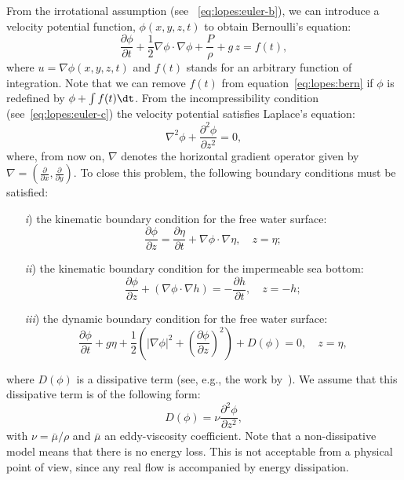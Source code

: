 From the irrotational assumption (see
~\eqref{eq:lopes:euler-b}), we can introduce a velocity
potential function, $\phi(x,y,z,t)$ to
obtain Bernoulli's equation:
\begin{equation}\label{eq:lopes:bern}
\frac{\partial \phi}{\partial t}+\frac{1}{2}\nabla \phi \cdot\nabla \phi
+\frac{P}{\rho} +g\, z=f(t),
\end{equation}
where $u=\nabla\phi(x,y,z,t)$ and $f(t)$ stands for an
arbitrary function of integration.  Note that we can remove
$f(t)$ from equation~\eqref{eq:lopes:bern} if $\phi$ is
redefined by $\phi+\int f(t) \dt$.  From the
incompressibility condition (see~\eqref{eq:lopes:euler-c})
the velocity potential satisfies Laplace's equation:
\begin{equation}\label{eq:lopes:lap}
\nabla^2\phi+\frac{\partial^2\phi}{\partial z^2}=0,
\end{equation}
where, from now on, $\nabla$ denotes the horizontal gradient
operator given by
$\nabla=\left(\frac{\partial }{\partial x},\frac{\partial
}{\partial y}\right)\!\!.$ To close
this problem, the following boundary conditions must be
satisfied:
\begin{enumerate}
\item[{\it i})] the kinematic boundary condition for the
  free water surface:
\begin{equation}
\frac{\partial \phi}{\partial
  z}=\frac{\partial\eta}{\partial t}+\nabla\phi\cdot\nabla\eta,\quad
z=\eta;
\end{equation}
\item[{\it ii})] the kinematic boundary condition for the
  impermeable sea bottom:
\begin{equation}
\frac{\partial \phi}{\partial z}+(\nabla\phi\cdot\nabla
h)=-\frac{\partial h}{\partial t}, \quad
z=-h ;
\end{equation}
\item[{\it iii})] the dynamic boundary condition for the
  free water surface:
\begin{equation}\label{eq:lopes:dyn}
\frac{\partial \phi}{\partial t}+ g\eta+\frac{1}{2} \left(|\nabla\phi|^2
+\left(\frac{\partial \phi}{\partial z}\right)^2\right)+
D(\phi)
= 0,
\quad z =\eta,
\end{equation}
\end{enumerate}
where $D(\phi)$ is a dissipative term (see, e.g., the work
by~\cite{DutykhDias2007}).  We assume that this dissipative
term is of the following form:
\begin{equation}\label{eq:lopes:diss}
 D(\phi)=\nu\frac{\partial ^2\phi}{\partial z^2},
\end{equation}
with $\nu=\bar{\mu}/\rho$ and $\bar{\mu}$ an eddy-viscosity
coefficient.  Note that a non-dissipative model means that
there is no energy loss.  This is not acceptable from a
physical point of view, since any real flow is accompanied
by energy dissipation.

